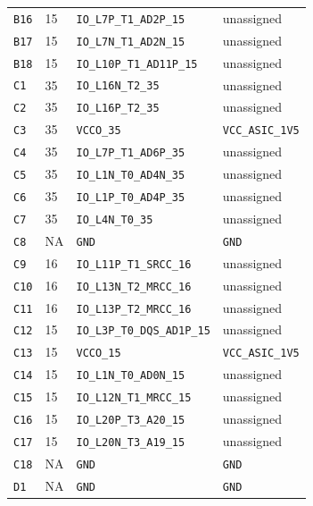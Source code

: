 \documentclass[11pt,a4paper]{article}
\begin{document}
\begin{longtable}{@{}P{13mm}P{13mm}P{78mm}P{62mm}@{}}
\nolinkurl{B16} & 15 & \nolinkurl{IO_L7P_T1_AD2P_15} & \textcolor{muted}{unassigned} \\
\nolinkurl{B17} & 15 & \nolinkurl{IO_L7N_T1_AD2N_15} & \textcolor{muted}{unassigned} \\
\nolinkurl{B18} & 15 & \nolinkurl{IO_L10P_T1_AD11P_15} & \textcolor{muted}{unassigned} \\
\nolinkurl{C1} & 35 & \nolinkurl{IO_L16N_T2_35} & \textcolor{muted}{unassigned} \\
\nolinkurl{C2} & 35 & \nolinkurl{IO_L16P_T2_35} & \textcolor{muted}{unassigned} \\
\nolinkurl{C3} & 35 & \nolinkurl{VCCO_35} & \nolinkurl{VCC_ASIC_1V5} \\
\nolinkurl{C4} & 35 & \nolinkurl{IO_L7P_T1_AD6P_35} & \textcolor{muted}{unassigned} \\
\nolinkurl{C5} & 35 & \nolinkurl{IO_L1N_T0_AD4N_35} & \textcolor{muted}{unassigned} \\
\nolinkurl{C6} & 35 & \nolinkurl{IO_L1P_T0_AD4P_35} & \textcolor{muted}{unassigned} \\
\nolinkurl{C7} & 35 & \nolinkurl{IO_L4N_T0_35} & \textcolor{muted}{unassigned} \\
\nolinkurl{C8} & NA & \nolinkurl{GND} & \nolinkurl{GND} \\
\nolinkurl{C9} & 16 & \nolinkurl{IO_L11P_T1_SRCC_16} & \textcolor{muted}{unassigned} \\
\nolinkurl{C10} & 16 & \nolinkurl{IO_L13N_T2_MRCC_16} & \textcolor{muted}{unassigned} \\
\nolinkurl{C11} & 16 & \nolinkurl{IO_L13P_T2_MRCC_16} & \textcolor{muted}{unassigned} \\
\nolinkurl{C12} & 15 & \nolinkurl{IO_L3P_T0_DQS_AD1P_15} & \textcolor{muted}{unassigned} \\
\nolinkurl{C13} & 15 & \nolinkurl{VCCO_15} & \nolinkurl{VCC_ASIC_1V5} \\
\nolinkurl{C14} & 15 & \nolinkurl{IO_L1N_T0_AD0N_15} & \textcolor{muted}{unassigned} \\
\nolinkurl{C15} & 15 & \nolinkurl{IO_L12N_T1_MRCC_15} & \textcolor{muted}{unassigned} \\
\nolinkurl{C16} & 15 & \nolinkurl{IO_L20P_T3_A20_15} & \textcolor{muted}{unassigned} \\
\nolinkurl{C17} & 15 & \nolinkurl{IO_L20N_T3_A19_15} & \textcolor{muted}{unassigned} \\
\nolinkurl{C18} & NA & \nolinkurl{GND} & \nolinkurl{GND} \\
\nolinkurl{D1} & NA & \nolinkurl{GND} & \nolinkurl{GND} \\

\end{longtable}
\end{document}
